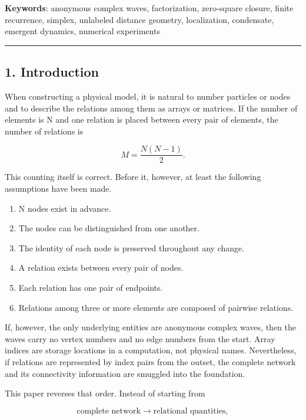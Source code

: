 \documentclass[
  a4paper,
]{article}
\providecommand{\tightlist}{%
  \setlength{\itemsep}{0pt}\setlength{\parskip}{0pt}}
\begin{document}
\textbf{Keywords}: anonymous complex waves, factorization, zero-square
closure, finite recurrence, simplex, unlabeled distance geometry,
localization, condensate, emergent dynamics, numerical experiments

\begin{center}\rule{0.5\linewidth}{0.5pt}\end{center}

\subsection{1. Introduction}\label{introduction}

When constructing a physical model, it is natural to number particles or
nodes and to describe the relations among them as arrays or matrices. If
the number of elements is N and one relation is placed between every
pair of elements, the number of relations is

\[
M=\frac{N(N-1)}{2}.
\]

This counting itself is correct. Before it, however, at least the
following assumptions have been made.

\begin{enumerate}
\def\labelenumi{\arabic{enumi}.}
\tightlist
\item
  N nodes exist in advance.
\item
  The nodes can be distinguished from one another.
\item
  The identity of each node is preserved throughout any change.
\item
  A relation exists between every pair of nodes.
\item
  Each relation has one pair of endpoints.
\item
  Relations among three or more elements are composed of pairwise
  relations.
\end{enumerate}

If, however, the only underlying entities are anonymous complex waves,
then the waves carry no vertex numbers and no edge numbers from the
start. Array indices are storage locations in a computation, not
physical names. Nevertheless, if relations are represented by index
pairs from the outset, the complete network and its connectivity
information are smuggled into the foundation.

This paper reverses that order. Instead of starting from

\[
\text{complete network}
\longrightarrow
\text{relational quantities},
\]
\end{document}
